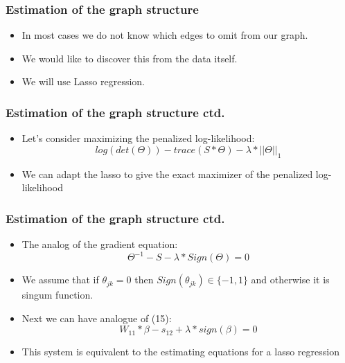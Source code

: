 \documentclass{beamer}
\begin{document}
\begin{frame}
\frametitle{Estimation of the graph structure}
\begin{itemize}
\item In most cases we do not know which edges to omit from our graph.
\item We would like to discover this from the data itself.
\item We will use Lasso regression.
\end{itemize}
\end{frame}

\begin{frame}
\frametitle{Estimation of the graph structure ctd.}
\begin{itemize}
\item Let's consider maximizing the penalized
log-likelihood:
\begin{equation}
log(det(\Theta))-trace(S*\Theta)-\lambda*||\Theta||_1
\end{equation}
\item We can adapt the lasso to give the exact maximizer of the penalized log-likelihood
\end{itemize}
\end{frame}

\begin{frame}
\frametitle{Estimation of the graph structure ctd.}
\begin{itemize}
\item The analog of the gradient equation:
\begin{equation}
\Theta^{-1} - S - \lambda*Sign(\Theta) = 0
\end{equation}
\item We assume that if $\theta_{jk} = 0$ then $Sign(\theta_{jk}) \in \{-1, 1\}$ and otherwise it is singum function.
\item Next we can have analogue of (15):
\begin{equation}
W_{11}*\beta - s_{12} + \lambda * sign(\beta) = 0
\end{equation}
\item This system is equivalent to the estimating equations for a lasso regression
\end{itemize}
\end{frame}
\end{document}
